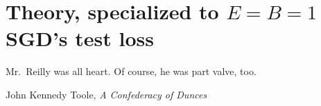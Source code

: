 \documentclass[openany, notitlepage, justified]{tufte-book}
\theoremstyle{plain}
\theoremstyle{definition}
\begin{document}

\chapter{Theory, specialized to $E=B=1$ SGD's test loss} \label{sect:calculus}

    \renewcommand{\textflush}{flushright}
    \setlength{\epigraphwidth}{0.61\columnwidth}
    \epigraph{
        Mr.\ Reilly was all heart.  Of course, he was part valve, too.
    }{John Kennedy Toole, \emph{A Confederacy of Dunces}}
\end{document}
